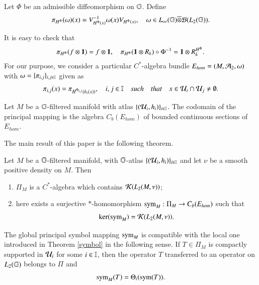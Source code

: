 \documentclass[leqno]{amsart}
\begin{document}
	
	
	\begin{definition}
		Let $\Phi$ be an admissible diffeomorphism on $\mathbb{G}$. Define
		\begin{align*}
			\pi_{H^{\Phi}}(\omega)(x)=V_{H^{\Phi}(x)}^{-1}\omega(x)V_{H^{\Phi}(x)}
			,\quad\omega\in L_{\infty}(\mathbb{G})\overline{\otimes}{\mathcal B}(L_{2}(\mathbb{G})).
		\end{align*}
	\end{definition}
	It is easy to check that
	\begin{align}\label{transfer}
		\pi_{H^{\Phi}}(f\otimes\mathbf 1)=f\otimes\mathbf 1,\quad
		\pi_{H^{\Phi}}(\mathbf 1\otimes R_{k})\circ \Phi^{-1}=\mathbf 1\otimes { R}^{H^{\Phi}}_{k}.
	\end{align}
	For our purpose, we consider a particular $C^{*}$-algebra bundle $E_{hom}=(M,{\mathcal A}_{2},\omega)$ with %
	$\omega=\{\pi_{i,j}\}_{i,j\in\mathbb I}$  given as
	\begin{align*}%
		\pi_{i,j}(x)=\pi_{H^{\Phi_{i,j}}(h_{i}(x))},\quad i,j\in\II \quad such\quad that\quad x\in\U_{i}\cap\U_{j}\neq\emptyset.
	\end{align*}
	\begin{definition}
		Let $M$ be a $\mathbb{G}$-filtered manifold with atlas $\{({\mathcal U}_{i},h_{i})\}_{i\in\mathbb I}$. The codomain of the principal mapping is the algebra  $C_{b}(E_{hom})$ of bounded continuous sections of $E_{hom}$. %
	\end{definition}
	
	
	The main result of this paper is the following theorem.
	\begin{theorem}\label{symbol on manifold}
		Let $M$ be a $\mathbb{G}$-filtered manifold, with $\mathbb{G}$-atlas $\{({\mathcal U}_{i},h_{i})\}_{i\in\mathbb I}$ and let $\nu$ be a smooth positive density on $M$. Then
		\begin{enumerate}[\rm(1)]
			\item $\Pi_{M}$ is a $C^{*}$-algebra which contains ${\mathcal K}(L_{2}(M,\nu))$;
			\item {}here exists a surjective $*$-homomorphism ${\rm sym}_{M}:\Pi_{M}\to C_{b}(E_{hom})$ such that $$\ker({\rm sym}_{M})={\mathcal K}(L_{2}(M,\nu)).$$
		\end{enumerate}
	\end{theorem}
	The global principal symbol mapping ${\rm sym}_{M}$ is compatible with the local one introduced in Theorem \ref{symbol} in the following sense. If $T\in\Pi_{M}$ is compactly supported in ${\mathcal U}_{i}$ for some $i\in\mathbb I$, then the operator $T$ transferred to an operator on $L_{2}(\mathbb{G})$ belongs to $\Pi$ and $${\rm sym}_{M}(T)=\Theta_{i}({\rm sym}(T)).$$
	
\end{document}
